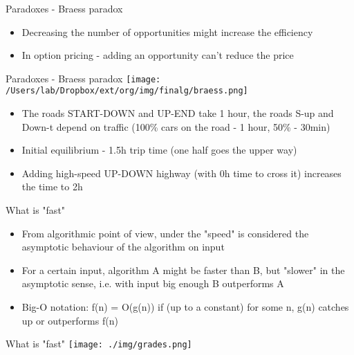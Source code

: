 \documentclass[presentation]{beamer}
\begin{document}
\begin{frame}[label=sec-2-17]{Paradoxes - Braess paradox}
\begin{itemize}
\item Decreasing the number of opportunities might increase the efficiency
\item In option pricing - adding an opportunity can't reduce the price
\end{itemize}
\end{frame}
\begin{frame}[label=sec-2-18]{Paradoxes - Braess paradox}
\texttt{[image: /Users/lab/Dropbox/ext/org/img/finalg/braess.png]}
\begin{itemize}
\item The roads START-DOWN and UP-END take 1 hour, the roads S-up and Down-t depend on traffic (100\% cars on the road - 1 hour, 50\% - 30min)
\item Initial equilibrium - 1.5h trip time (one half goes the upper way)
\item Adding high-speed UP-DOWN highway (with 0h time to cross it) increases the time to 2h
\end{itemize}
\end{frame}
\begin{frame}[label=sec-2-19]{What is "fast"}
\begin{itemize}
\item From algorithmic point of view, under the "speed" is considered the asymptotic behaviour of the algorithm on input
\item For a certain input, algorithm A might be faster than B, but "slower" in the asymptotic sense, i.e. with input big enough B outperforms A
\item Big-O notation: f(n) = O(g(n)) if (up to a constant) for some n,  g(n) catches up or outperforms f(n)
\end{itemize}
\end{frame}
\begin{frame}[label=sec-2-20]{What is "fast"}
\texttt{[image: ./img/grades.png]}
\end{frame}
\end{document}
